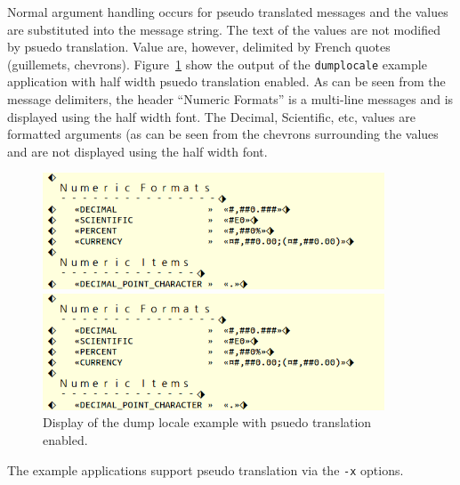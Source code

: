 Normal argument handling occurs for pseudo translated messages and the
values are substituted into the message string.  The text of the values are
not modified by psuedo translation.  Value are, however, delimited by
French quotes (guillemets, chevrons).  Figure~\ref{fig:pseudo-dump}
show the output of the \texttt{dumplocale} example application with
half width psuedo translation enabled.  As can be seen from the message
delimiters, the header ``Numeric Formats'' is a multi-line messages and
is displayed using the half width font.  The Decimal, Scientific, etc,
values are formatted arguments (as can be seen from the chevrons surrounding
the values and are not displayed using the half width font.
\begin{figure}
\begin{center}
\begin{latexonly}
    \includegraphics[angle=90,width=4in]{images/pseudo-dump.png}
\end{latexonly}
\begin{htmlonly}
    \includegraphics[width=4in]{images/pseudo-dump.png}
\end{htmlonly}
\end{center}
\caption{Display of the dump locale example with psuedo translation enabled.}
\label{fig:pseudo-dump}
\end{figure}

The example applications support pseudo translation via the \verb|-x|
options.

